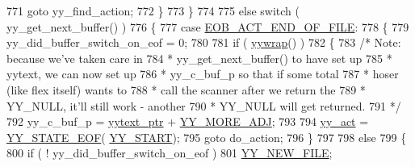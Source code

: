 \begin{DoxyCode}
771                                 \textcolor{keywordflow}{goto} yy\_find\_action;
772                                 \}
773                         \}
774 
775                 \textcolor{keywordflow}{else} \textcolor{keywordflow}{switch} ( yy\_get\_next\_buffer() )
776                         \{
777                         \textcolor{keywordflow}{case} \mbox{\hyperlink{expr-lex_8cpp_a7f71d7fa2c403eb4b2f38cb9536f3c63}{EOB\_ACT\_END\_OF\_FILE}}:
778                                 \{
779                                 yy\_did\_buffer\_switch\_on\_eof = 0;
780 
781                                 \textcolor{keywordflow}{if} ( \mbox{\hyperlink{expr-lex_8cpp_ade1e2db9970733fbc3d9fecd09ce9771}{yywrap}}() )
782                                         \{
783                                         \textcolor{comment}{/* Note: because we've taken care in}
784 \textcolor{comment}{                                         * yy\_get\_next\_buffer() to have set up}
785 \textcolor{comment}{                                         * yytext, we can now set up}
786 \textcolor{comment}{                                         * yy\_c\_buf\_p so that if some total}
787 \textcolor{comment}{                                         * hoser (like flex itself) wants to}
788 \textcolor{comment}{                                         * call the scanner after we return the}
789 \textcolor{comment}{                                         * YY\_NULL, it'll still work - another}
790 \textcolor{comment}{                                         * YY\_NULL will get returned.}
791 \textcolor{comment}{                                         */}
792                                         yy\_c\_buf\_p = \mbox{\hyperlink{expr-lex_8cpp_a790a191a93ef4d3b8c0bb43fd7480052}{yytext\_ptr}} + 
      \mbox{\hyperlink{expr-lex_8cpp_a68792d73820bc46a71d3d4e613f0b977}{YY\_MORE\_ADJ}};
793 
794                                         \mbox{\hyperlink{expr-lex_8cpp_a7ffc8c947830757dd87ad202a6823edd}{yy\_act}} = \mbox{\hyperlink{expr-lex_8cpp_ab3077e60914fc54dcc55ecae1ce9700b}{YY\_STATE\_EOF}}(
      \mbox{\hyperlink{expr-lex_8cpp_a8e14785f9eab7a997d659b25af9584c5}{YY\_START}});
795                                         \textcolor{keywordflow}{goto} do\_action;
796                                         \}
797 
798                                 \textcolor{keywordflow}{else}
799                                         \{
800                                         \textcolor{keywordflow}{if} ( ! yy\_did\_buffer\_switch\_on\_eof )
801                                                 \mbox{\hyperlink{expr-lex_8cpp_a0406739e64fb5750cf995d2ae68ce69d}{YY\_NEW\_FILE}};

\end{DoxyCode}
